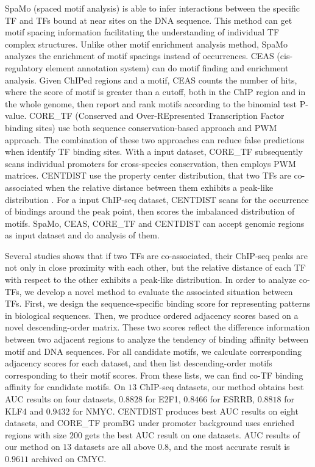 \documentclass[journal,transmag]{IEEEtran}
\begin{document}
SpaMo (spaced motif analysis) is able to infer interactions between
the specific TF and TFs bound at near sites on the DNA sequence.
This method can get motif spacing information facilitating the
understanding of individual TF complex structures. Unlike other
motif enrichment analysis method, SpaMo analyzes the enrichment of
motif spacings instead of occurrences. CEAS (cis-regulatory element
annotation system) can do motif finding and enrichment analysis.
Given ChIPed regions and a motif, CEAS counts the number of hits,
where the score of motif is greater than a cutoff, both in the ChIP
region and in the whole genome, then report and rank motifs
according to the binomial test P-value. CORE\_TF (Conserved and
Over-REpresented Transcription Factor binding sites) use both
sequence conservation-based approach and PWM approach. The
combination of these two approaches can reduce false predictions
when identify TF binding sites. With a input dataset, CORE\_TF
subsequently scans individual promoters for cross-species
conservation, then employs PWM matrices. CENTDIST use the property
center distribution, that two TFs are co-associated when the
relative distance between them exhibits a peak-like distribution
\cite{mybibifle:centdistgenomic,mybibfile:centdistsignal,mybibfile:centdistnucleo}.
For a input ChIP-seq dataset, CENTDIST scans for the occurrence of
bindings around the peak point, then scores the imbalanced
distribution of motifs. SpaMo, CEAS, CORE\_TF and CENTDIST can
accept genomic regions as input dataset and do analysis of them.


Several studies shows that if two TFs are co-associated, their
ChIP-seq peaks are not only in close proximity with each other, but
the relative distance of each TF with respect to the other exhibits
a peak-like distribution. In order to analyze co-TFs, we develop a
novel method to evaluate the associated situation between TFs.
First, we design the sequence-specific binding score for
representing patterns in biological sequences. Then, we produce
ordered adjacency scores based on a novel descending-order matrix.
These two scores reflect the difference information between two
adjacent regions to analyze the tendency of binding affinity between
motif and DNA sequences. For all candidate motifs, we calculate
corresponding adjacency scores for each dataset, and then list
descending-order motifs corresponding to their motif scores. From
these lists, we can find co-TF binding affinity for candidate
motifs. On $13$ ChIP-seq datasets, our method obtains best AUC
results on four datasets, $0.8828$ for E2F1, $0.8466$ for ESRRB,
$0.8818$ for KLF4 and $0.9432$ for NMYC. CENTDIST produces best AUC
results on eight datasets, and CORE\_TF promBG under promoter
background uses enriched regions with size $200$ gets the best AUC
result on one datasets. AUC results of our method on $13$ datasets
are all above $0.8$, and the most accurate result is $0.9611$
archived on CMYC.
\end{document}
